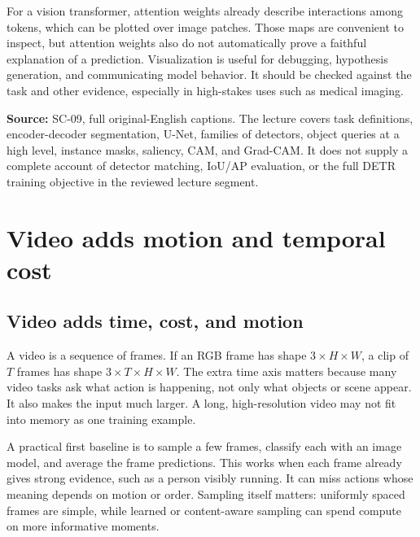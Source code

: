 For a vision transformer, attention weights already describe interactions among tokens, which can be plotted over image patches. Those maps are convenient to inspect, but attention weights also do not automatically prove a faithful explanation of a prediction. Visualization is useful for debugging, hypothesis generation, and communicating model behavior. It should be checked against the task and other evidence, especially in high-stakes uses such as medical imaging.

\textbf{Source:} SC-09, full original-English captions. The lecture covers task definitions, encoder-decoder segmentation, U-Net, families of detectors, object queries at a high level, instance masks, saliency, CAM, and Grad-CAM. It does not supply a complete account of detector matching, IoU/AP evaluation, or the full DETR training objective in the reviewed lecture segment.

\section{Video adds motion and temporal cost}\label{04-visual-computing-ii-ch031-video-adds-motion-and-temporal-cost}

\hypertarget{04-visual-computing-ii-ch031-video-adds-motion-and-temporal-cost}{}

\subsection{Video adds time, cost, and motion}\label{04-visual-computing-ii-ch031-video-adds-time-cost-and-motion}

\hypertarget{04-visual-computing-ii-ch031-video-adds-time-cost-and-motion}{}

A video is a sequence of frames. If an RGB frame has shape \(3\times H\times W\), a clip of \(T\) frames has shape \(3\times T\times H\times W\). The extra time axis matters because many video tasks ask what action is happening, not only what objects or scene appear. It also makes the input much larger. A long, high-resolution video may not fit into memory as one training example.

A practical first baseline is to sample a few frames, classify each with an image model, and average the frame predictions. This works when each frame already gives strong evidence, such as a person visibly running. It can miss actions whose meaning depends on motion or order. Sampling itself matters: uniformly spaced frames are simple, while learned or content-aware sampling can spend compute on more informative moments.

